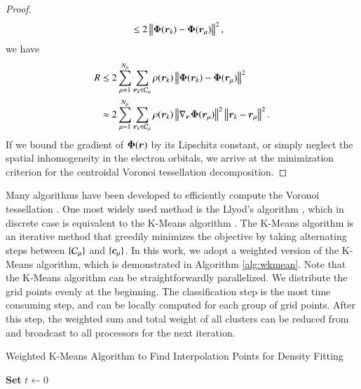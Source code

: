 \begin{proof}
\begin{align}
    &\mathrel{\leq} 2 \left\lVert\bm{\Phi}(\bm{r}_{k})-\bm{\Phi}(\bm{r}_{\mu})\right\rVert^2,
  \end{align}
  we have
  \begin{align}
    R &\mathrel{\leq} 2 \sum_{\mu=1}^{N_\mu}\sum_{\bm{r}_k\in \mathcal{C}_\mu}\rho(\bm{r}_k) 
    \left\lVert\bm{\Phi}(\bm{r}_{k})-\bm{\Phi}(\bm{r}_{\mu})\right\rVert^2 \\
    &\approx 2 \sum_{\mu=1}^{N_\mu}\sum_{\bm{r}_k\in \mathcal{C}_\mu}\rho(\bm{r}_k)
    \left\lVert\nabla_{\bm{r}}\bm{\Phi}(\bm{r}_{\mu})\right\rVert^2 \left\lVert\bm{r}_{k}-\bm{r}_{\mu}\right\rVert^2.
  \end{align}
  If we bound the gradient of $\bm{\Phi}(\bm{r})$ by its Lipschitz constant, or simply
  neglect the spatial inhomogeneity in the electron orbitals, we arrive at the
  minimization criterion for the centroidal Voronoi tessellation decomposition.
\end{proof}

Many algorithms have been developed to efficiently compute the Voronoi
tessellation \cite{medvedev1986algorithm}. One most widely used method is the
Llyod's algorithm \cite{lloyd1982least}, which in discrete case is equivalent to
the K-Means algorithm \cite{MacQueen1967}. The K-Means algorithm is an iterative
method that greedily minimizes the objective by taking alternating steps between
$\{\mathcal{C}_\mu\}$ and $\{\bm{c}_\mu\}$. In this work, we adopt a weighted version of
the K-Means algorithm, which is demonstrated in Algorithm \ref{alg:wkmean}. Note
that the K-Means algorithm can be straightforwardly parallelized. We distribute
the grid points evenly at the beginning. The classification step is the most
time consuming step, and can be locally computed for each group of grid points.
After this step, the weighted sum and total weight of all clusters can be
reduced from and broadcast to all processors for the next iteration.


\begin{algorithm}
  \caption{Weighted K-Means Algorithm to Find Interpolation Points for Density
  Fitting}\label{alg:wkmean}
  \DontPrintSemicolon
  \textbf{Set} $t\gets 0$\;

\end{algorithm}

